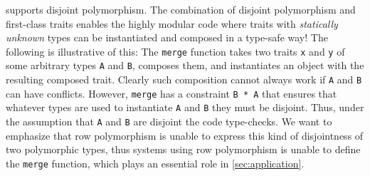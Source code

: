 \begin{comment}
One important difference to traditional traits or classes is that traits in
\name are quite dynamic: we are able to compose traits \emph{dynamically} and
then instantiate them later. We have seen an example of dynamic inheritance in
\cref{sec:overview} to mimic mixins, where disjoint polymorphism plays an
important role. This is impossible in traditional OO languages, such as Scala,
since classes being inherited/instantiated must be known statically.

In Scala, given two concrete traits, it is possible to use \emph{mixin composition} to
create an object that implements both traits.
\begin{lstlisting}[language=scala]
trait A
trait B
val newAB : A with B = new A with B
\end{lstlisting}
Here the type \lstinline[language=scala]{A with B} is an intersection type,
and the expression \lstinline[language=scala]{new A with B} allows creating a new
object from the combination of the traits \lstinline{A} and
\lstinline{B}.
However, in Scala it is not possible to dynamically compose two
(statically unknown) \emph{objects}. For example, the following code: \jeremy{how is this useful to have?}
\begin{lstlisting}[language=scala]
// Invalid Scala code:
def merge[A,B] (x: A) (y: B) : A with B = new x with y
\end{lstlisting}
is rejected by the Scala compiler. The problem is that the
\lstinline[language=scala]{with} construct in Scala can only be used to mixin
(statically known) traits or classes, not arbitrary objects. This limitation essentially puts
intersection types in Scala in a second-class status.
\end{comment}

\name supports disjoint polymorphism. The combination of disjoint
polymorphism and first-class traits enables the highly modular code
where traits with \emph{statically unknown} types can be instantiated
and composed in a type-safe way! The following is illustrative of this:
The \lstinline{merge} function takes two traits \lstinline{x} and \lstinline{y} of
some arbitrary types \lstinline{A} and \lstinline{B}, composes them,
and instantiates an object with the resulting composed trait. Clearly
such composition cannot always work if \lstinline{A} and
\lstinline{B} can have conflicts. However, \lstinline{merge} has a
constraint \lstinline{B * A} that ensures that whatever types are used
to instantiate \lstinline{A} and \lstinline{B} they must be disjoint.
Thus, under the assumption that \lstinline{A} and \lstinline{B} are
disjoint the code type-checks. We want to emphasize that row polymorphism is unable to express
this kind of disjointness of two polymorphic types, thus systems using row polymorphism is unable to define
the \lstinline{merge} function, which plays an essential role in \cref{sec:application}.

